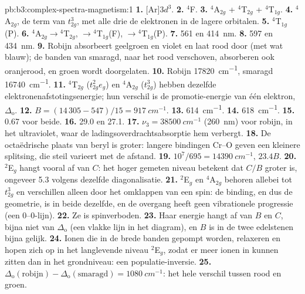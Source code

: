 \begin{solution}{pb:b3:complex-spectra-magnetism:1}
\textbf{1.} [Ar]$3d^3$.
\textbf{2.} $^4$F.
\textbf{3.} $^4$A$_{2g}$ + $^4$T$_{2g}$ + $^4$T$_{1g}$.
\textbf{4.} $^4$A$_{2g}$, de term van $t_{2g}^3$, met alle drie de elektronen in de lagere orbitalen.
\textbf{5.} $^4$T$_{1g}$(P).
\textbf{6.} $^4$A$_{2g}\to{}^4$T$_{2g}$, $\to{}^4$T$_{1g}$(F), $\to{}^4$T$_{1g}$(P).
\textbf{7.} 561 en \qty{414}{nm}.
\textbf{8.} 597 en \qty{434}{nm}.
\textbf{9.} Robijn absorbeert geelgroen en violet en laat rood door (met wat
blauw); de banden van smaragd, naar het rood verschoven, absorberen ook
oranjerood, en groen wordt doorgelaten.
\textbf{10.} Robijn \qty{17820}{cm^{-1}}, smaragd \qty{16740}{cm^{-1}}.
\textbf{11.} $^4$T$_{2g}$ ($t_{2g}^2e_g$) en $^4$A$_{2g}$ ($t_{2g}^3$) hebben dezelfde elektronenafstotingsenergie; hun
verschil is de promotie-energie van één elektron, $\Delta_{\mathrm o}$.
\textbf{12.} $B = (14\,305 - 547)/15 = \qty{917}{cm^{-1}}$.
\textbf{13.} \qty{614}{cm^{-1}}.
\textbf{14.} \qty{618}{cm^{-1}}.
\textbf{15.} 0.67 voor beide.
\textbf{16.} 29.0 en 27.1.
\textbf{17.} $\nu_3 = \qty{38500}{cm^{-1}}$ (\qty{260}{nm}) voor robijn, in het ultraviolet, waar de
ladingsoverdrachtsabsorptie hem verbergt.
\textbf{18.} De octaëdrische plaats van beryl is groter: langere bindingen
Cr--O geven een kleinere splitsing, die steil varieert met de afstand.
\textbf{19.} $10^7/695 = \qty{14390}{cm^{-1}}$, $23.4B$.
\textbf{20.} $^2$E$_g$ hangt vooral af van $C$: het hoger gemeten niveau betekent dat $C/B$ groter is,
ongeveer 5.3 volgens dezelfde diagonalisatie.
\textbf{21.} $^2$E$_g$ en $^4$A$_{2g}$ behoren allebei tot $t_{2g}^3$ en verschillen alleen door het omklappen van een spin: de binding,
en dus de geometrie, is in beide dezelfde, en de overgang heeft geen
vibrationele progressie (een 0--0-lijn).
\textbf{22.} Ze is spinverboden.
\textbf{23.} Haar energie hangt af van $B$ en $C$, bijna niet van $\Delta_{\mathrm o}$ (een vlakke lijn in het diagram),
en $B$ is in de twee edelstenen bijna gelijk.
\textbf{24.} Ionen die in de brede banden gepompt worden, relaxeren en hopen
zich op in het langlevende
niveau $^2$E$_g$, zodat er meer ionen in kunnen zitten dan in het grondniveau: een
populatie-inversie.
\textbf{25.} \textbf{$\Delta_{\mathrm o}(\text{robijn}) - \Delta_{\mathrm o}(\text{smaragd}) = \qty{1080}{cm^{-1}}$}: het hele verschil tussen rood en
groen.
\end{solution}
